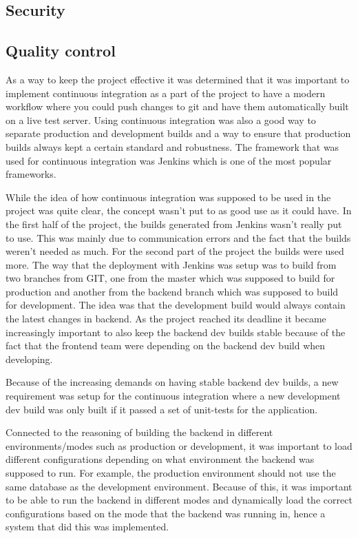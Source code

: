 
\subsection{Security}

\subsection{Quality control}
As a way to keep the project effective it was determined that it was important to implement continuous integration as a part of the project to have a modern workflow where you could push changes to git and have them automatically built on a live test server. Using continuous integration was also a good way to separate production and development builds and a way to ensure that production builds always kept a certain standard and robustness. The framework that was used for continuous integration was Jenkins which is one of the most popular frameworks.

While the idea of how continuous integration was supposed to be used in the project was quite clear, the concept wasn't put to as good use as it could have. In the first half of the project, the builds generated from Jenkins wasn't really put to use. This was mainly due to communication errors and the fact that the builds weren't needed as much. For the second part of the project the builds were used more. The way that the deployment with Jenkins was setup was to build from two branches from GIT, one from the master which was supposed to build for production and another from the backend branch which was supposed to build for development. The idea was that the development build would always contain the latest changes in backend. As the project reached its deadline it became increasingly important to also keep the backend dev builds stable because of the fact that the frontend team were depending on the backend dev build when developing.

Because of the increasing demands on having stable backend dev builds, a new requirement was setup for the continuous integration where a new development dev build was only built if it passed a set of unit-tests for the application.

Connected to the reasoning of building the backend in different environments/modes such as production or development, it was important to load different configurations depending on what environment the backend was supposed to run. For example, the production environment should not use the same database as the development environment. Because of this, it was important to be able to run the backend in different modes and dynamically load the correct configurations based on the mode that the backend was running in, hence a system that did this was implemented.

